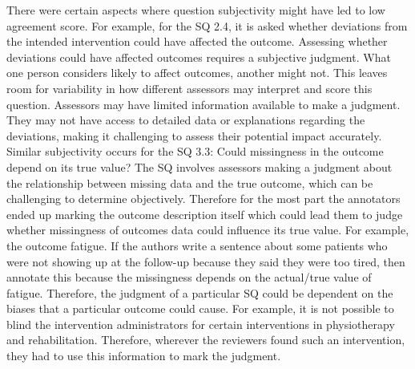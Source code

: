 \documentclass[sn-mathphys,Numbered]{sn-jnl}%
\theoremstyle{thmstyleone}%
\theoremstyle{thmstyletwo}%
\theoremstyle{thmstylethree}%
\begin{document}
There were certain aspects where question subjectivity might have led to low agreement score.
For example, for the SQ 2.4, it is asked whether deviations from the intended intervention could have affected the outcome.
Assessing whether deviations could have affected outcomes requires a subjective judgment.
What one person considers likely to affect outcomes, another might not.
This leaves room for variability in how different assessors may interpret and score this question.
Assessors may have limited information available to make a judgment.
They may not have access to detailed data or explanations regarding the deviations, making it challenging to assess their potential impact accurately.
Similar subjectivity occurs for the SQ 3.3: Could missingness in the outcome depend on its true value?
The SQ involves assessors making a judgment about the relationship between missing data and the true outcome, which can be challenging to determine objectively.
Therefore for the most part the annotators ended up marking the outcome description itself which could lead them to judge whether missingness of outcomes data could influence its true value.
For example, the outcome fatigue.
If the authors write a sentence about some patients who were not showing up at the follow-up because they said they were too tired, then annotate this because the missingness depends on the actual/true value of fatigue.
Therefore, the judgment of a particular SQ could be dependent on the biases that a particular outcome could cause.
For example, it is not possible to blind the intervention administrators for certain interventions in physiotherapy and rehabilitation.
Therefore, wherever the reviewers found such an intervention, they had to use this information to mark the judgment.
%
%
%
\end{document}
